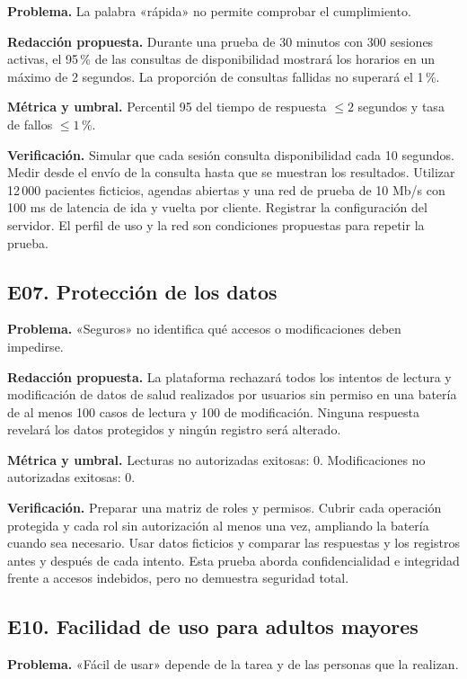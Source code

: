 \documentclass[11pt,a4paper]{article}
\begin{document}
\textbf{Problema.}
La palabra «rápida» no permite comprobar el cumplimiento.

\textbf{Redacción propuesta.}
Durante una prueba de 30 minutos con 300 sesiones activas,
el 95\,\% de las consultas de disponibilidad mostrará los horarios
en un máximo de 2 segundos. La proporción de consultas fallidas
no superará el 1\,\%.

\textbf{Métrica y umbral.}
Percentil 95 del tiempo de respuesta $\leq 2$ segundos y
tasa de fallos $\leq 1\,\%$.

\textbf{Verificación.}
Simular que cada sesión consulta disponibilidad cada 10 segundos.
Medir desde el envío de la consulta hasta que se muestran los
resultados. Utilizar 12\,000 pacientes ficticios, agendas abiertas
y una red de prueba de 10 Mb/s con 100 ms de latencia de ida y
vuelta por cliente. Registrar la configuración del servidor.
El perfil de uso y la red son condiciones propuestas para
repetir la prueba.

\subsection{E07. Protección de los datos}

\textbf{Problema.}
«Seguros» no identifica qué accesos o modificaciones deben impedirse.

\textbf{Redacción propuesta.}
La plataforma rechazará todos los intentos de lectura y modificación
de datos de salud realizados por usuarios sin permiso en una batería
de al menos 100 casos de lectura y 100 de modificación.
Ninguna respuesta revelará los datos protegidos y ningún registro
será alterado.

\textbf{Métrica y umbral.}
Lecturas no autorizadas exitosas: 0.
Modificaciones no autorizadas exitosas: 0.

\textbf{Verificación.}
Preparar una matriz de roles y permisos. Cubrir cada operación
protegida y cada rol sin autorización al menos una vez, ampliando
la batería cuando sea necesario. Usar datos ficticios y comparar
las respuestas y los registros antes y después de cada intento.
Esta prueba aborda confidencialidad e integridad frente a accesos
indebidos, pero no demuestra seguridad total.

\subsection{E10. Facilidad de uso para adultos mayores}

\textbf{Problema.}
«Fácil de usar» depende de la tarea y de las personas que la realizan.
\end{document}
